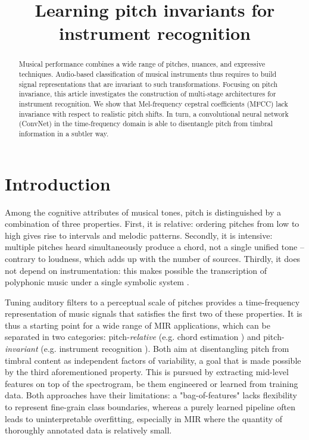 \documentclass{article}
\title{Learning pitch invariants for instrument recognition}
\makeatletter
\newcommand*{\eg}{e.g.\@\xspace}
\makeatother
\begin{document}
%
\maketitle
%
\begin{abstract}
Musical performance combines a wide range of pitches, nuances,
and expressive techniques.
Audio-based classification of musical instruments thus requires to
build signal representations that are invariant to such transformations.
Focusing on pitch invariance, this article investigates the construction
of multi-stage architectures for instrument recognition.
We show that Mel-frequency cepstral coefficients (MFCC) lack
invariance with respect to realistic pitch shifts.
In turn, a convolutional neural network (ConvNet) in the time-frequency
domain is able to disentangle pitch from timbral information in a subtler way.
\end{abstract}

\section{Introduction}\label{sec:introduction}
Among the cognitive attributes of musical tones, pitch is distinguished
by a combination of three properties.
First, it is relative: ordering pitches from low to high gives rise to
intervals and melodic patterns.
Secondly, it is intensive: multiple pitches heard simultaneously produce
a chord, not a single unified tone -- contrary to loudness, which adds
up with the number of sources.
Thirdly, it does not depend on instrumentation: this makes possible
the transcription of polyphonic music under a single symbolic system
\cite{deCheveigne2005}.

Tuning auditory filters to a perceptual scale of pitches provides a
time-frequency representation of music signals that satisfies the first two of these properties.
It is thus a starting point for a wide range of MIR applications,
which can be separated in two categories: pitch-\emph{relative}
(\eg chord estimation \cite{Humphrey2012})
and pitch-\emph{invariant} (\eg instrument recognition \cite{Eronen2000}).
Both aim at disentangling pitch from timbral content as independent
factors of variability, a goal that is made possible by the third aforementioned property.
This is pursued by extracting mid-level features on top of the spectrogram,
be them engineered or learned from training data.
Both approaches have their limitations: a "bag-of-features" lacks flexibility
to represent fine-grain class boundaries, whereas a purely learned pipeline
often leads to uninterpretable overfitting, especially in MIR where the quantity
of thoroughly annotated data is relatively small.
\end{document}
